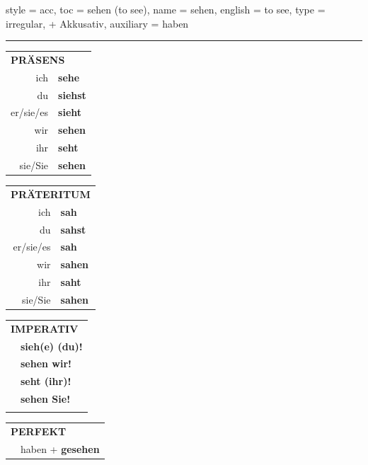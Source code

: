 \begin{verbentry}{
  style = {acc},
  toc = {sehen (to see)},
  name = {sehen},
  english = {to see},
  type = {irregular, + Akkusativ},
  auxiliary = {haben}
}
 
    
     \vspace{5pt}

    \hrule
    
    \vspace{5pt}

  \begin{tabular}{rl}
     \multicolumn{2}{l}{\textbf{PRÄSENS} }\\
    ich & \textbf{sehe}\\
    du & \textbf{siehst}\\
    er/sie/es & \textbf{sieht}\\
    wir & \textbf{sehen}\\
    ihr & \textbf{seht}\\
    sie/Sie & \textbf{sehen}\\
  \end{tabular}
  \hfill
     \begin{tabular}{rl}
    \multicolumn{2}{l}{\textbf{PRÄTERITUM} }\\
    ich & \textbf{sah}\\
    du & \textbf{sahst}\\
    er/sie/es & \textbf{sah}\\
    wir & \textbf{sahen}\\
    ihr & \textbf{saht}\\
    sie/Sie & \textbf{sahen}\\
  \end{tabular}
  \hfill
  \begin{tabular}{rl}
     \multicolumn{2}{l}{\textbf{IMPERATIV} }\\
   & \textbf{sieh(e) (du)!}\\
   & \textbf{sehen wir!}\\
   & \textbf{seht (ihr)!}\\
   & \textbf{sehen Sie!}\\
   & \vspace{10pt}
  \end{tabular}

    \vspace{10pt}

 \begin{tabular}{rl}
     \multicolumn{2}{l}{\textbf{PERFEKT}}\\
  &  haben + \textbf{gesehen}\\
  \end{tabular}
\hfill
   \begin{tabular}{rl}
   

\end{tabular}
\end{verbentry}

